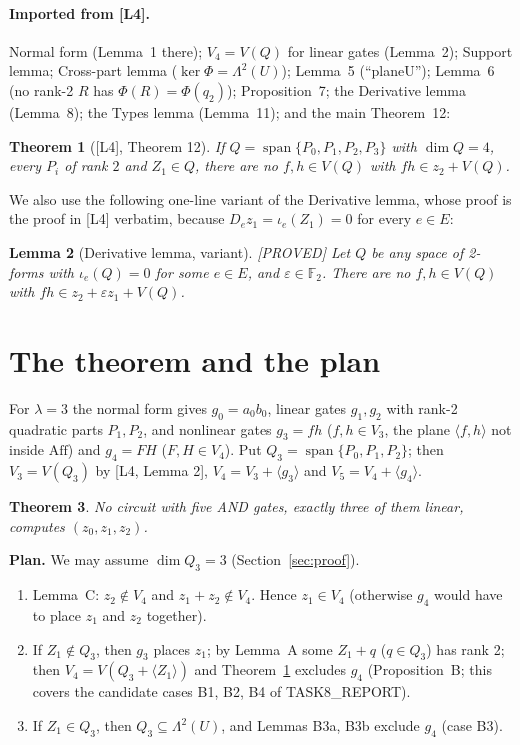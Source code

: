 \documentclass[11pt,a4paper]{article}
\theoremstyle{plain}
\newtheorem{theorem}{Theorem}
\newtheorem{lemma}[theorem]{Lemma}
\theoremstyle{definition}
\theoremstyle{remark}
\newcommand{\F}{\mathbb{F}_2}
\newcommand{\Aff}{\mathrm{Aff}}
\newcommand{\Span}{\operatorname{span}}
\newcommand{\Lam}{\Lambda^{2}}
\newcommand{\status}[1]{\hfill\textsf{[#1]}}
\begin{document}
\paragraph{Imported from [L4].} Normal form (Lemma~1 there); $V_4=V(Q)$ for linear gates (Lemma~2); Support lemma; Cross-part lemma ($\ker\Phi=\Lam(U)$); Lemma~5 (``planeU''); Lemma~6 (no rank-2 $R$ has $\Phi(R)=\Phi(q_2)$); Proposition~7; the Derivative lemma (Lemma~8); the Types lemma (Lemma~11); and the main Theorem~12:

\begin{theorem}[{[L4], Theorem 12}]\label{thm:L4}
If $Q=\Span\{P_0,P_1,P_2,P_3\}$ with $\dim Q=4$, every $P_i$ of rank $2$ and $Z_1\in Q$, there are no $f,h\in V(Q)$ with $fh\in z_2+V(Q)$.
\end{theorem}

We also use the following one-line variant of the Derivative lemma, whose proof is the proof in [L4] verbatim, because $D_ez_1=\iota_e(Z_1)=0$ for every $e\in E$:

\begin{lemma}[Derivative lemma, variant]\label{lem:deriv}\status{PROVED}
Let $Q$ be any space of 2-forms with $\iota_e(Q)=0$ for some $e\in E$, and $\varepsilon\in\F$. There are no $f,h\in V(Q)$ with $fh\in z_2+\varepsilon z_1+V(Q)$.
\end{lemma}

\section{The theorem and the plan}

For $\lambda=3$ the normal form gives $g_0=a_0b_0$, linear gates $g_1,g_2$ with rank-2 quadratic parts $P_1,P_2$, and nonlinear gates $g_3=fh$ ($f,h\in V_3$, the plane $\langle f,h\rangle$ not inside $\Aff$) and $g_4=FH$ ($F,H\in V_4$). Put $Q_3=\Span\{P_0,P_1,P_2\}$; then $V_3=V(Q_3)$ by [L4, Lemma 2], $V_4=V_3+\langle g_3\rangle$ and $V_5=V_4+\langle g_4\rangle$.

\begin{theorem}\label{thm:main}
No circuit with five AND gates, exactly three of them linear, computes $(z_0,z_1,z_2)$.
\end{theorem}

\noindent\textbf{Plan.} We may assume $\dim Q_3=3$ (Section~\ref{sec:proof}).
\begin{enumerate}[1.]
\item Lemma~C: $z_2\notin V_4$ and $z_1+z_2\notin V_4$. Hence $z_1\in V_4$ (otherwise $g_4$ would have to place $z_1$ and $z_2$ together).
\item If $Z_1\notin Q_3$, then $g_3$ places $z_1$; by Lemma~A some $Z_1+q$ ($q\in Q_3$) has rank 2; then $V_4=V(Q_3+\langle Z_1\rangle)$ and Theorem~\ref{thm:L4} excludes $g_4$ (Proposition~B; this covers the candidate cases B1, B2, B4 of TASK8\_REPORT).
\item If $Z_1\in Q_3$, then $Q_3\subseteq\Lam(U)$, and Lemmas B3a, B3b exclude $g_4$ (case B3).
\end{enumerate}
\end{document}
